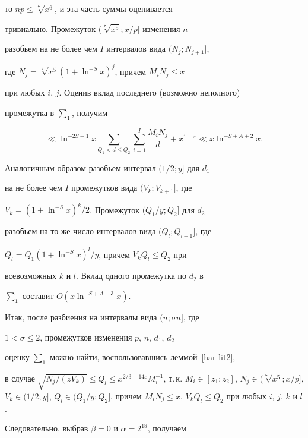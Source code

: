 то $np \le \sqrt[7]{x^6}$, и эта часть суммы оценивается


тривиально. Промежуток $(\sqrt[7]{x^5}; x/p]$ изменения $n$


разобьем на не более чем $I$ интервалов вида $(N_j; N_{j+1}]$,


где $N_j=\sqrt[7]{x^5}(1+ \ln^{-S}x)^j$, причем $M_i N_j \le x$


при любых $i$, $j$. Оценив вклад последнего (возможно неполного)


промежутка в $\sum_1$, получим


$$


\ll \ln^{-2S+1}x \sum_{Q_1 < d \le Q_2} \sum_{i=1}^I


\frac{M_i N_j}{d} + x^{1 - \varepsilon}


\ll x \ln^{-S+A+2} x.


$$





Аналогичным образом разобьем интервал $(1/2; y]$ для $d_1$


на не более чем $I$ промежутков вида $(V_k; V_{k+1}]$, где


$V_k=(1+ \ln^{-S} x)^k/2$. Промежуток $(Q_1/y; Q_2]$ для $d_2$


разобьем на то же число интервалов вида $(Q_l; Q_{l+1}]$, где


$Q_l=Q_1(1+ \ln^{-S}x)^l/y$, причем $V_k Q_l \le Q_2$ при


всевозможных $k$ и $l$. Вклад одного промежутка по $d_2$ в


$\sum_1$ составит $O(x \ln^{-S+A+3} x)$.





Итак, после разбиения на интервалы вида $(u; \sigma u]$, где


$1< \sigma \le 2$, промежутков изменения $p$, $n$, $d_1$, $d_2$


оценку $\sum_1$ можно найти, воспользовавшись леммой~\ref{har-lit2},


в случае $\sqrt {N_j/(z V_k)} \le Q_l \le x^{2/3 -14 \varepsilon}


M_i^{-1}$, т.\,к. $M_i \in [z_1; z_2]$, $N_j \in (\sqrt[7]{x^5};


x/p]$, $V_k \in (1/2; y]$, $Q_l \in (Q_1/y; Q_2]$, причем $M_i


N_j \le x$, $V_k Q_l \le Q_2$ при любых $i$, $j$, $k$ и $l$.


Следовательно, выбрав $\beta=0$ и $\alpha=2^{18}$, получаем


